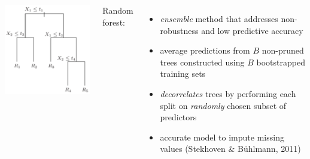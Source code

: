 \documentclass[20pt,margin=1in,innermargin=-4.5in,blockverticalspace=-0.25in]{tikzposter}
\begin{document}
\begin{columns}
{        \vspace{-1.5em}

        \begin{center}
        \begin{tikzfigure}[]
            \includegraphics[scale=1.9]{tree.png}
        \end{tikzfigure}
        \end{center}

        \vspace{-3em}
        
        Random forest:
        \vspace{-0.5em}
        \begin{itemize}
            \item \textit{ensemble} method that addresses non-robustness and low predictive accuracy
            \vspace{-0.5em}
            \item average predictions from $B$ non-pruned trees constructed using $B$ bootstrapped training sets 
            \vspace{-0.5em}
            \item \textit{decorrelates} trees by performing each split on \textit{randomly} chosen subset of predictors
            \vspace{-0.5em}
            \item accurate model to impute missing values (Stekhoven \& Bühlmann, 2011)
            \vspace{-1em}
        \end{itemize} 
    }


\end{columns}
\end{document}
